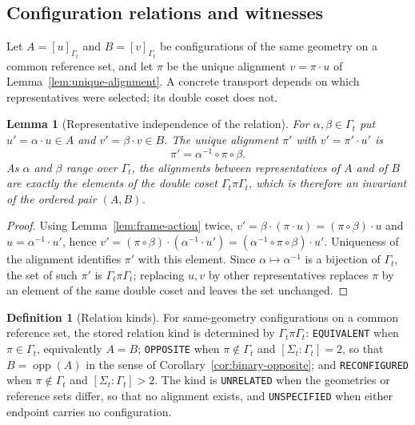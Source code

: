 \documentclass[pdflatex,sn-mathphys-num,referee,lineno]{sn-jnl}
\newcommand{\code}[1]{\texttt{#1}}
\theoremstyle{plain}
\newtheorem{lemma}[theorem]{Lemma}
\theoremstyle{remark}
\theoremstyle{definition}
\newtheorem{definition}{Definition}
\begin{document}
\subsection{Configuration relations and witnesses}
\label{sec:local-relations}

Let \(A=[u]_{\Gamma_t}\) and \(B=[v]_{\Gamma_t}\) be configurations of the same
geometry on a common reference set, and let \(\pi\) be the unique alignment
\(v=\pi\cdot u\) of Lemma~\ref{lem:unique-alignment}.  A concrete transport
depends on which representatives were selected; its double coset does not.

\begin{lemma}[Representative independence of the relation]
\label{lem:double-coset}
For \(\alpha,\beta\in\Gamma_t\) put \(u'=\alpha\cdot u\in A\) and
\(v'=\beta\cdot v\in B\).  The unique alignment \(\pi'\) with
\(v'=\pi'\cdot u'\) is
\[
  \pi'=\alpha^{-1}\circ\pi\circ\beta .
\]
As \(\alpha\) and \(\beta\) range over \(\Gamma_t\), the alignments between
representatives of \(A\) and of \(B\) are exactly the elements of the double
coset \(\Gamma_t\pi\Gamma_t\), which is therefore an invariant of the ordered
pair \((A,B)\).
\end{lemma}

\begin{proof}
Using Lemma~\ref{lem:frame-action} twice,
\(v'=\beta\cdot(\pi\cdot u)=(\pi\circ\beta)\cdot u\) and
\(u=\alpha^{-1}\cdot u'\), hence
\(v'=(\pi\circ\beta)\cdot(\alpha^{-1}\cdot u')
=(\alpha^{-1}\circ\pi\circ\beta)\cdot u'\).
Uniqueness of the alignment identifies \(\pi'\) with this element.  Since
\(\alpha\mapsto\alpha^{-1}\) is a bijection of \(\Gamma_t\), the set of such
\(\pi'\) is \(\Gamma_t\pi\Gamma_t\); replacing \(u,v\) by other representatives
replaces \(\pi\) by an element of the same double coset and leaves the set
unchanged.
\end{proof}

\begin{definition}[Relation kinds]
\label{def:relation-kinds}
For same-geometry configurations on a common reference set, the stored relation
kind is determined by \(\Gamma_t\pi\Gamma_t\):
\code{EQUIVALENT} when \(\pi\in\Gamma_t\), equivalently \(A=B\);
\code{OPPOSITE} when \(\pi\notin\Gamma_t\) and \([\Sigma_t:\Gamma_t]=2\), so
that \(B=\operatorname{opp}(A)\) in the sense of
Corollary~\ref{cor:binary-opposite}; and \code{RECONFIGURED} when
\(\pi\notin\Gamma_t\) and \([\Sigma_t:\Gamma_t]>2\).  The kind is
\code{UNRELATED} when the geometries or reference sets differ, so that no
alignment exists, and \code{UNSPECIFIED} when either endpoint carries no
configuration.
\end{definition}
\end{document}
